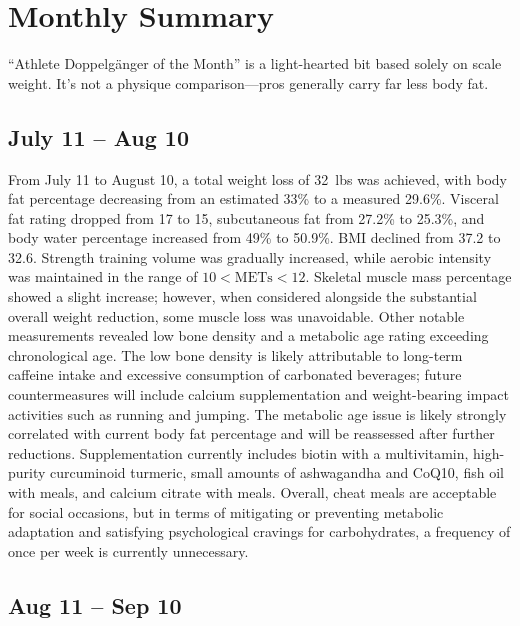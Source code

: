 \section{Monthly Summary}
\label{sec:Summary}
“Athlete Doppelgänger of the Month” is a light-hearted bit based solely on scale weight. It’s not a physique comparison—pros generally carry far less body fat.
\subsection{July 11 -- Aug 10}

From July 11 to August 10, a total weight loss of 32~lbs was achieved, with body fat percentage decreasing from an estimated 33\% to a measured 29.6\%. Visceral fat rating dropped from 17 to 15, subcutaneous fat from 27.2\% to 25.3\%, and body water percentage increased from 49\% to 50.9\%. BMI declined from 37.2 to 32.6. Strength training volume was gradually increased, while aerobic intensity was maintained in the range of $10 < \mathrm{METs} < 12$. Skeletal muscle mass percentage showed a slight increase; however, when considered alongside the substantial overall weight reduction, some muscle loss was unavoidable. Other notable measurements revealed low bone density and a metabolic age rating exceeding chronological age. The low bone density is likely attributable to long-term caffeine intake and excessive consumption of carbonated beverages; future countermeasures will include calcium supplementation and weight-bearing impact activities such as running and jumping. The metabolic age issue is likely strongly correlated with current body fat percentage and will be reassessed after further reductions. Supplementation currently includes biotin with a multivitamin, high-purity curcuminoid turmeric, small amounts of ashwagandha and CoQ10, fish oil with meals, and calcium citrate with meals. Overall, cheat meals are acceptable for social occasions, but in terms of mitigating or preventing metabolic adaptation and satisfying psychological cravings for carbohydrates, a frequency of once per week is currently unnecessary.


\subsection{Aug 11 -- Sep 10}

